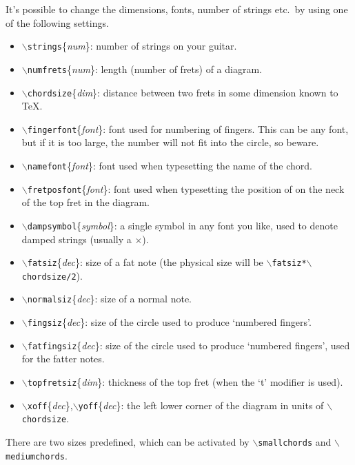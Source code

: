 \documentclass{article}
\begin{document}
It's possible to change the dimensions, fonts, number of strings etc.\ by
using one of the following settings.
\begin{itemize}
\item {$\backslash${\tt strings}\{{\it num}\/\}}: number of strings on your guitar.
\item {$\backslash${\tt numfrets}\{{\it num}\/\}}: length (number of frets) of
a diagram.
\item {$\backslash${\tt chordsize}\{{\it dim}\/\}}: distance between two frets in some
dimension known to \TeX.
\item {$\backslash${\tt fingerfont}\{{\it font}\/\}}: font used for numbering of
fingers. This can be any font, but if it is too large, the number will not
fit into the circle, so beware.
\item {$\backslash${\tt namefont}\{{\it font}\/\}}: font used when typesetting the name
of the chord.
\item {$\backslash${\tt fretposfont}\{{\it font}\/\}}: font used when typesetting the
position of on the neck of the top fret in the diagram.
\item {$\backslash${\tt dampsymbol}\{{\it symbol}\/\}}: a single symbol in any font you
like, used to denote damped strings (usually a $\times$).
\item {$\backslash${\tt fatsiz}\{{\it dec}\/\}}: size of a fat note (the physical size
will be {$\backslash${\tt fatsiz*}$\backslash${\tt chordsize/2}}).
\item {$\backslash${\tt normalsiz}\{{\it dec}\/\}}: size of a normal note.
\item {$\backslash${\tt fingsiz}\{{\it dec}\/\}}: size of the circle used to produce
`numbered fingers'.
\item {$\backslash${\tt fatfingsiz}\{{\it dec}\/\}}: size of the circle used to produce
`numbered fingers', used for the fatter notes.
\item {$\backslash${\tt topfretsiz}\{{\it dim}\}}: thickness of the
  top fret (when the `t' modifier is used).
\item {$\backslash${\tt xoff}\{{\it dec}\/\}},{$\backslash${\tt yoff}\{{\it dec}\/\}}: the left lower
corner of the diagram in units of {$\backslash${\tt chordsize}}.
\end{itemize}

There are two sizes predefined, which can be activated by
{$\backslash${\tt smallchords}} and {$\backslash${\tt mediumchords}}.
\end{document}
